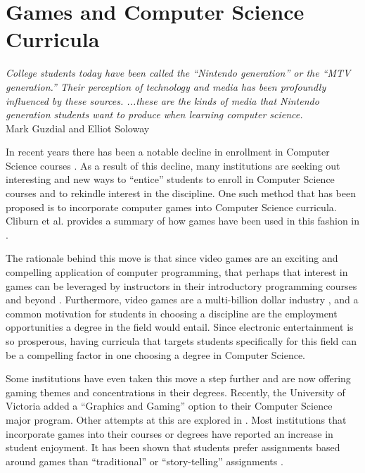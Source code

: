 \section{Games and Computer Science Curricula}
\label{chapter:problemSec:games}

\begin{flushright}
\textit{College students today have been called the ``Nintendo generation'' or the ``MTV generation.'' Their perception of technology and media has been profoundly influenced by these sources. ...these are the kinds of media that Nintendo generation students want to produce when learning computer science.}
\\
Mark Guzdial and Elliot Soloway \cite{Guzdial02} \\
\end{flushright}

In recent years there has been a notable decline in enrollment in Computer Science courses \cite{Manaris07,Vesgo07,Ward08,Bayliss09}.  As a result of this decline, many institutions are seeking out interesting and new ways to ``entice'' students to enroll in Computer Science courses and to rekindle interest in the discipline.  One such method that has been proposed is to incorporate computer games into Computer Science curricula.  Cliburn et al. provides a summary of how games have been used in this fashion in \cite{Cliburn06}.

The rationale behind this move is that since video games are an exciting and compelling application of computer programming, that perhaps that interest in games can be leveraged by instructors in their introductory programming courses and beyond \cite{Barnes08,Sweedyk05,Overmars04}.  Furthermore, video games are a multi-billion dollar industry \cite{Wallace06}, and a common motivation for students in choosing a discipline are the employment opportunities a degree in the field would entail.  Since electronic entertainment is so prosperous, having curricula that targets students specifically for this field can be a compelling factor in one choosing a degree in Computer Science.

Some institutions have even taken this move a step further and are now offering gaming themes and concentrations in their degrees.  Recently, the University of Victoria added a ``Graphics and Gaming'' option to their Computer Science major program.  Other attempts at this are explored in \cite{Leutenegger07,Murray06,Zyda06}.  Most institutions that incorporate games into their courses or degrees have reported an increase in student enjoyment.  It has been shown that students prefer assignments based around games than ``traditional'' or ``story-telling'' assignments \cite{Cliburn08}.

